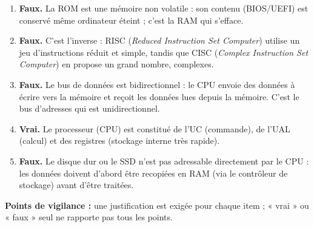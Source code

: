 \documentclass[11pt]{article}
\newcommand{\cle}[1]{{\popxbold\color{popdark}#1}}
\begin{document}
\begin{corrige}
\begin{enumerate}
    \item \textbf{Faux.} La ROM est une mémoire \cle{non volatile} : son contenu (BIOS/UEFI) est conservé même ordinateur éteint ; c'est la RAM qui s'efface.
    \item \textbf{Faux.} C'est l'inverse : RISC (\emph{Reduced Instruction Set Computer}) utilise un jeu d'instructions \cle{réduit et simple}, tandis que CISC (\emph{Complex Instruction Set Computer}) en propose un grand nombre, complexes.
    \item \textbf{Faux.} Le bus de données est \cle{bidirectionnel} : le CPU envoie des données à écrire vers la mémoire et reçoit les données lues depuis la mémoire. C'est le bus d'adresses qui est unidirectionnel.
    \item \textbf{Vrai.} Le processeur (CPU) est constitué de l'UC (commande), de l'UAL (calcul) et des registres (stockage interne très rapide).
    \item \textbf{Faux.} Le disque dur ou le SSD n'est pas adressable directement par le CPU : les données doivent d'abord être \cle{recopiées en RAM} (via le contrôleur de stockage) avant d'être traitées.
\end{enumerate}
\textbf{Points de vigilance :} une justification est exigée pour chaque item ; « vrai » ou « faux » seul ne rapporte pas tous les points.
\end{corrige}
\end{document}
